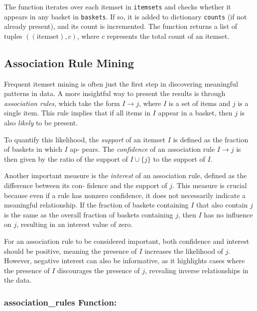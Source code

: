 \documentclass{Class/julia}
\begin{document}
The function iterates over each itemset in \texttt{itemsets} and checks whether it appears in any basket in \texttt{baskets}. If so, it is added to dictionary \texttt{counts} (if not already present), and its count is incremented. The function returns a list of tuples \(((\text{itemset}), c)\), where \( c \) represents the total count of an itemset.

\subsection{Association Rule Mining}

Frequent itemset mining is often just the first step in discovering meaningful patterns in data. A more insightful way to present the results is through \textit{association rules}, which take the form \( I \rightarrow j \), where \( I \) is a set of items and \( j \) is a single item. This rule implies that if all items in \( I \) appear in a basket, then \( j \) is also \textit{likely} to be present.

To quantify this likelihood, the \textit{support} of an itemset \( I \) is defined as the fraction of baskets in which \( I \) ap- pears. The \textit{confidence} of an association rule \( I \rightarrow j \) is then given by the ratio of the support of \( I \cup \{j\} \) to the support of \( I \).

Another important measure is the \textit{interest} of an association rule, defined as the difference between its con- fidence and the support of \( j \). This measure is crucial because even if a rule has nonzero confidence, it does not necessarily indicate a meaningful relationship. If the fraction of baskets containing \( I \) that also contain \( j \) is the same as the overall fraction of baskets containing \( j \), then \( I \) has no influence on \( j \), resulting in an interest value of zero. 

For an association rule to be considered important, both confidence and interest should be positive, meaning the presence of \( I \) increases the likelihood of \( j \). However, negative interest can also be informative, as it highlights cases where the presence of \( I \) discourages the presence of \( j \), revealing inverse relationships in the data.

\subsubsection*{association\_rules Function:}
\end{document}
